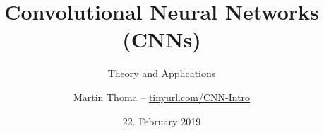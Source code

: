 \documentclass{beamer}
\begin{document}
\title{Convolutional Neural Networks (CNNs)}
\subtitle{Theory and Applications}
\author{Martin Thoma -- \footnotesize \href{http://tinyurl.com/CNN-Intro}{tinyurl.com/CNN-Intro}}
\date{22. February 2019}
\subject{Machine Learning, AI, Neural Networks, Convolutional Neural Networks}

\frame{\titlepage}
\end{document}
